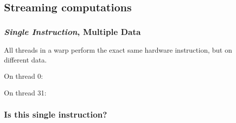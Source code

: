 \subsection{Streaming computations}\label{streaming-computations}

\subsubsection{\emph{Single Instruction}, Multiple
Data}\label{single-instruction-multiple-data}

All threads in a warp perform the exact same hardware instruction, but
on different data.

On thread 0:

\begin{Shaded}
\begin{Highlighting}[]
\NormalTok{a[}\NormalTok{] = alpha * x[}\NormalTok{] + }\NormalTok{;}
\NormalTok{y[}\NormalTok{] -= a[}\NormalTok{];}
\end{Highlighting}
\end{Shaded}

On thread 31:

\begin{Shaded}
\begin{Highlighting}[]
\NormalTok{a[}\NormalTok{] = alpha * x[}\NormalTok{] + }\NormalTok{;}
\NormalTok{y[}\NormalTok{] -= a[}\NormalTok{];}
\end{Highlighting}
\end{Shaded}

\subsubsection{Is this single
instruction?}\label{is-this-single-instruction}

\begin{Shaded}
\begin{Highlighting}[]
\NormalTok{: -}
\NormalTok{)}
  \NormalTok{;}
  \NormalTok{;}

\NormalTok{y[thread_id] -= a[} \NormalTok{- thread_id];}
\end{Highlighting}
\end{Shaded}

